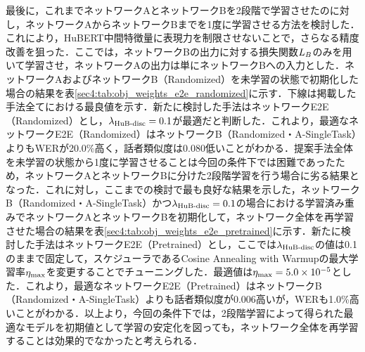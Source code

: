 最後に，これまでネットワークAとネットワークBを2段階で学習させたのに対し，ネットワークAからネットワークBまでを1度に学習させる方法を検討した．これにより，HuBERT中間特徴量に表現力を制限させないことで，さらなる精度改善を狙った．ここでは，ネットワークBの出力に対する損失関数$L_{B}$のみを用いて学習させ，ネットワークAの出力は単にネットワークBへの入力とした．ネットワークAおよびネットワークB（Randomized）を未学習の状態で初期化した場合の結果を表\ref{sec4:tab:obj_weights_e2e_randomized}に示す．下線は掲載した手法全てにおける最良値を示す．新たに検討した手法はネットワークE2E（Randomized）とし，$\lambda_{\text{HuB-disc}} = 0.1$が最適だと判断した．これより，最適なネットワークE2E（Randomized）はネットワークB（Randomized・A-SingleTask）よりもWERが20.0\%高く，話者類似度は0.080低いことがわかる．提案手法全体を未学習の状態から1度に学習させることは今回の条件下では困難であったため，ネットワークAとネットワークBに分けた2段階学習を行う場合に劣る結果となった．これに対し，ここまでの検討で最も良好な結果を示した，ネットワークB（Randomized・A-SingleTask）かつ$\lambda_{\text{HuB-disc}} = 0.1$の場合における学習済み重みでネットワークAとネットワークBを初期化して，ネットワーク全体を再学習させた場合の結果を表\ref{sec4:tab:obj_weights_e2e_pretrained}に示す．新たに検討した手法はネットワークE2E（Pretrained）とし，ここでは$\lambda_{\text{HuB-disc}}$の値は0.1のままで固定して，スケジューラであるCosine Annealing with Warmupの最大学習率$\eta_{\text{max}}$を変更することでチューニングした．最適値は$\eta_{\text{max}} = 5.0 \times 10^{-5}$とした．これより，最適なネットワークE2E（Pretrained）はネットワークB（Randomized・A-SingleTask）よりも話者類似度が0.006高いが，WERも1.0\%高いことがわかる．以上より，今回の条件下では，2段階学習によって得られた最適なモデルを初期値として学習の安定化を図っても，ネットワーク全体を再学習することは効果的でなかったと考えられる．

